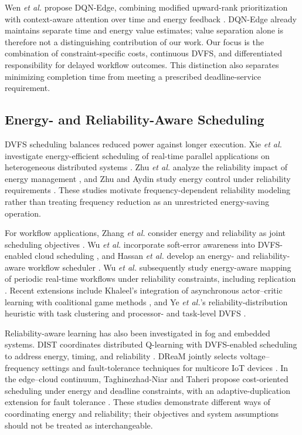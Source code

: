 \documentclass[lettersize,journal]{IEEEtran}
\begin{document}
Wen \emph{et al.} propose DQN-Edge, combining modified upward-rank
prioritization with context-aware attention over time and energy
feedback \cite{wen2026}. DQN-Edge already maintains separate time and
energy value estimates; value separation alone is therefore not a
distinguishing contribution of our work. Our focus is the combination
of constraint-specific costs, continuous DVFS, and differentiated
responsibility for delayed workflow outcomes. This distinction also
separates minimizing completion time from meeting a prescribed
deadline-service requirement.

\subsection{Energy- and Reliability-Aware Scheduling}

DVFS scheduling balances reduced power against longer execution.
Xie \emph{et al.} investigate energy-efficient scheduling of real-time
parallel applications on heterogeneous distributed systems
\cite{xie2017energy}. Zhu \emph{et al.} analyze the reliability impact of
energy management \cite{zhu2004}, and Zhu and Aydin study energy control
under reliability requirements \cite{zhu2006energy}. These studies
motivate frequency-dependent reliability modeling rather than treating
frequency reduction as an unrestricted energy-saving operation.

For workflow applications, Zhang \emph{et al.} consider energy and
reliability as joint scheduling objectives \cite{zhang2017}. Wu
\emph{et al.} incorporate soft-error awareness into DVFS-enabled cloud
scheduling \cite{wu2018}, and Hassan \emph{et al.} develop an energy-
and reliability-aware workflow scheduler \cite{hassan2020}. Wu
\emph{et al.} subsequently study energy-aware mapping of periodic
real-time workflows under reliability constraints, including replication
\cite{wu2023}. Recent extensions include Khaleel's integration of
asynchronous actor--critic learning with coalitional game methods
\cite{coalition2025}, and Ye \emph{et al.}'s reliability-distribution
heuristic with task clustering and processor- and task-level DVFS
\cite{ye2026}.

Reliability-aware learning has also been investigated in fog and
embedded systems. DIST coordinates distributed Q-learning with
DVFS-enabled scheduling to address energy, timing, and reliability
\cite{oustad2025dist}. DReaM jointly selects voltage--frequency settings
and fault-tolerance techniques for multicore IoT devices
\cite{esnaashari2025dream}. In the edge--cloud continuum,
Taghinezhad-Niar and Taheri propose cost-oriented scheduling under energy
and deadline constraints, with an adaptive-duplication extension for
fault tolerance \cite{taghinezhad2025recr}. These studies demonstrate
different ways of coordinating energy and reliability; their objectives
and system assumptions should not be treated as interchangeable.
\end{document}
